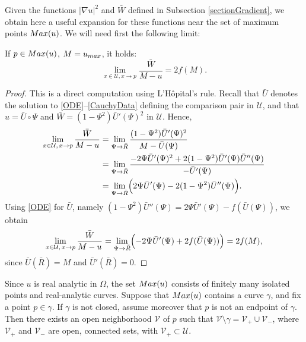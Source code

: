 \documentclass[11pt]{article}
\newcommand{\U}{\mathcal{U}}
\newcommand{\abs}[1]{\left\vert #1 \right\vert}
\numberwithin{equation} {section}
\begin{document}
Given the functions $\abs{\nabla u}^2$ and $\bar W$ defined in Subsection \ref{sectionGradient}, we obtain here a useful expansion for these functions near the set of maximum points $\textup{Max} (u)$. We will need first the following limit:
\begin{lemma}\label{lemma_limit}
	If $p \in \textup{Max}(u)$, $M= u_{\textup{max}}$, it holds:
	\[
	\displaystyle\lim_{x \in \mathcal{U},x \to p} \frac{\bar{W}}{M-u} = 2 f(M).
	\]	
\end{lemma}
\begin{proof}
This is a direct computation using L'H\^{o}pital's rule. Recall that $\bar U$ denotes the solution to
\eqref{ODE}--\eqref{CauchyData} defining the comparison pair in $\U$, and that
$u=\bar U\circ \Psi$ and $\bar W=(1-\Psi^2)\bar U'(\Psi)^2$ in $\U$. Hence,
\[
\begin{split}
\lim_{x\in \U,\,x\to p}\frac{\bar W}{M-u}
&=\lim_{\Psi\to \bar R}\frac{(1-\Psi^2)\bar U'(\Psi)^2}{M-\bar U(\Psi)} \\
&=\lim_{\Psi\to \bar R}\frac{-2\Psi \bar U'(\Psi)^2+2(1-\Psi^2)\bar U'(\Psi)\bar U''(\Psi)}{-\bar U'(\Psi)} \\
&=\lim_{\Psi\to \bar R}\Bigl(2\Psi \bar U'(\Psi)-2(1-\Psi^2)\bar U''(\Psi)\Bigr).
\end{split}
\]
Using \eqref{ODE} for $\bar U$, namely
$(1-\Psi^2)\bar U''(\Psi)=2\Psi \bar U'(\Psi)-f(\bar U(\Psi))$, we obtain
\[
\lim_{x\in \U,\,x\to p}\frac{\bar W}{M-u}
=\lim_{\Psi\to \bar R}\Bigl(-2\Psi \bar U'(\Psi)+2 f(\bar U(\Psi))\Bigr)
=2 f(M),
\]
since $\bar U(\bar R)=M$ and $\bar U'(\bar R)=0$.
\end{proof}
Since $u$ is real analytic in $\Omega$, the set $\textup{Max}(u)$ consists of finitely many isolated points and real-analytic curves. Suppose that $\textup{Max}(u)$ contains a curve $\gamma$, and fix a point $p \in \gamma$. If $\gamma$ is not closed, assume moreover that $p$ is not an endpoint of $\gamma$. Then there exists an open neighborhood $\mathcal V$ of $p$ such that $\mathcal V \setminus \gamma = \mathcal V_+ \cup \mathcal V_-$, where $\mathcal V_+$ and $\mathcal V_-$ are open, connected sets, with $\mathcal V_+ \subset \mathcal U$.
\end{document}
